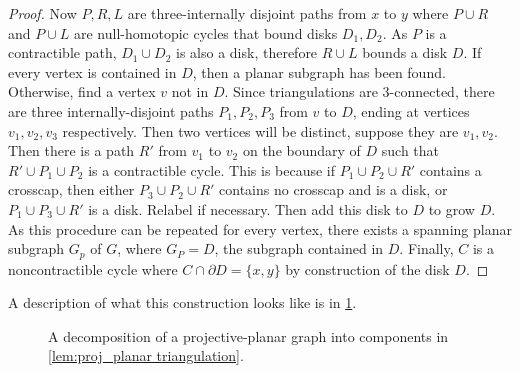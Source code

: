 \begin{proof}
    Now $P, R, L$ are three-internally disjoint paths from $x$ to $y$ where $P \cup R$ and $P \cup L$ are null-homotopic cycles that bound disks $D_1, D_2$. As $P$ is a contractible path, $D_1 \cup D_2$ is also a disk, therefore $R \cup L$ bounds a disk $D$. If every vertex is contained in $D$, then a planar subgraph has been found. Otherwise, find a vertex $v$ not in $D$. Since triangulations are 3-connected, there are three internally-disjoint paths $P_1, P_2, P_3$ from $v$ to $D$, ending at vertices $v_1, v_2, v_3$ respectively. Then two vertices will be distinct, suppose they are $v_1, v_2$. Then there is a path $R'$ from $v_1$ to $v_2$ on the boundary of $D$ such that $R' \cup P_1 \cup P_2$ is a contractible cycle. This is because if $P_1 \cup P_2 \cup R'$ contains a crosscap, then either $P_3 \cup P_2 \cup R'$ contains no crosscap and is a disk, or $P_1 \cup P_3 \cup R'$ is a disk. Relabel if necessary. Then add this disk to $D$ to grow $D$. As this procedure can be repeated for every vertex, there exists a spanning planar subgraph $G_p$ of $G$, where $G_P = D$, the subgraph contained in $D$. Finally, $C$ is a noncontractible cycle where $C \cap \partial D = \{x, y\}$ by construction of the disk $D$. 
\end{proof}
A description of what this construction looks like is in \cref{fig:projectiveplanardecomp}.
\begin{figure}[h]
    \centering
    
    \caption[Projective-planar decomposition]{A decomposition of a projective-planar graph into components in \cref{lem:proj_planar triangulation}.}\label{fig:projectiveplanardecomp}
\end{figure}

